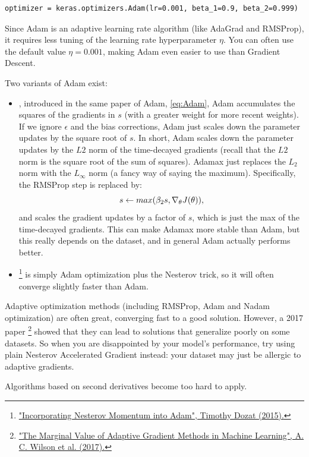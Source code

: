 \begin{lstlisting}
optimizer = keras.optimizers.Adam(lr=0.001, beta_1=0.9, beta_2=0.999)
\end{lstlisting}
Since Adam is an adaptive learning rate algorithm (like AdaGrad and RMSProp), it requires less tuning of the learning rate hyperparameter $\eta$. You can often use the default value $\eta = 0.001$, making Adam even easier to use than Gradient Descent.

Two variants of Adam exist:
\begin{itemize}
\item {}, introduced in the same paper of Adam, \autoref{eq:Adam}, Adam accumulates the squares of the gradients in $s$ (with a greater weight for more recent weights). If we ignore $\epsilon$ and the bias corrections, Adam just scales down the parameter updates by the square root of $s$. In short, Adam scales down the parameter updates by the $L2$ norm of the time-decayed gradients (recall that the $L2$ norm is the square root of the sum of squares). Adamax just replaces the $L_2$ norm with the $L_\infty$ norm (a fancy way of saying the maximum). Specifically, the RMSProp step is replaced by:
\begin{equation}
s \leftarrow max\br{\beta_2 s, \nabla_\theta J(\theta)},
\end{equation}
and scales the gradient updates by a factor of $s$, which is just the max of the time-decayed gradients. This can make Adamax more stable than Adam, but this really depends on the dataset, and in general Adam actually performs better.
\item {}\footnote{\href{https://homl.info/nadam}{"Incorporating Nesterov Momentum into Adam", Timothy Dozat (2015).}} is simply Adam optimization plus the Nesterov trick, so it will often converge slightly faster than Adam. 
\end{itemize}

Adaptive optimization methods (including RMSProp, Adam and Nadam optimization) are often great, converging fast to a good solution. However, a 2017 paper \footnote{\href{https://homl.info/60}{"The Marginal Value of Adaptive Gradient Methods in Machine Learning", A. C. Wilson et al. (2017).}} showed that they can lead to solutions that generalize poorly on some datasets. So when you are disappointed by your model's performance, try using plain Nesterov Accelerated Gradient instead: your dataset may just be allergic to adaptive gradients.

Algorithms based on second derivatives become too hard to apply.


